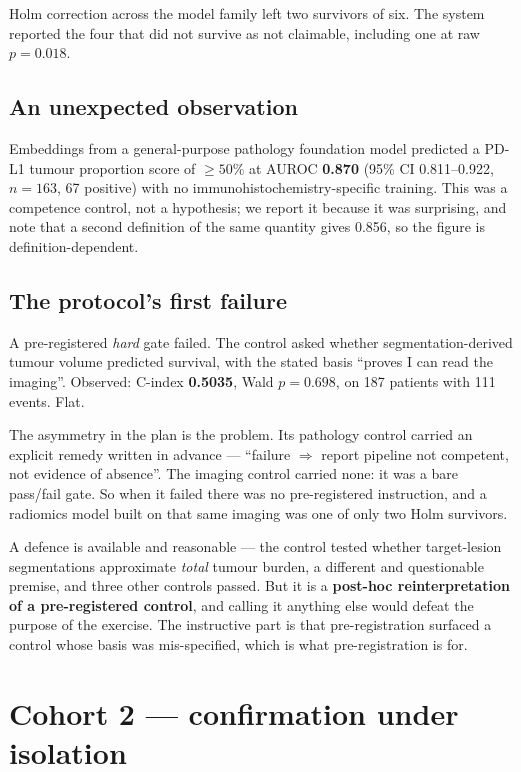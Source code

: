 \documentclass[11pt,a4paper]{article}
\begin{document}
Holm correction across the model family left two survivors of six. The system reported the four
that did not survive as not claimable, including one at raw $p = 0.018$.

\subsection{An unexpected observation}

Embeddings from a general-purpose pathology foundation model predicted a PD-L1 tumour proportion
score of $\geq 50\%$ at AUROC \textbf{0.870} (95\% CI 0.811--0.922, $n = 163$, 67 positive) with no
immunohistochemistry-specific training. This was a competence control, not a hypothesis; we report
it because it was surprising, and note that a second definition of the same quantity gives 0.856,
so the figure is definition-dependent.

\subsection{The protocol's first failure}

A pre-registered \emph{hard} gate failed. The control asked whether segmentation-derived tumour
volume predicted survival, with the stated basis ``proves I can read the imaging''. Observed:
C-index \textbf{0.5035}, Wald $p = 0.698$, on 187 patients with 111 events. Flat.

The asymmetry in the plan is the problem. Its pathology control carried an explicit remedy written
in advance --- ``failure $\Rightarrow$ report pipeline not competent, not evidence of absence''.
The imaging control carried none: it was a bare pass/fail gate. So when it failed there was no
pre-registered instruction, and a radiomics model built on that same imaging was one of only two
Holm survivors.

A defence is available and reasonable --- the control tested whether target-lesion segmentations
approximate \emph{total} tumour burden, a different and questionable premise, and three other
controls passed. But it is a \textbf{post-hoc reinterpretation of a pre-registered control}, and
calling it anything else would defeat the purpose of the exercise. The instructive part is that
pre-registration surfaced a control whose basis was mis-specified, which is what pre-registration
is for.

\section{Cohort 2 --- confirmation under isolation}
\end{document}
